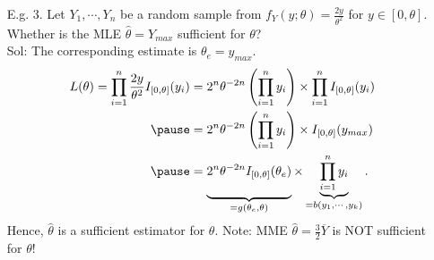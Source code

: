 \begin{frame}
 \begin{enumerate}
  \item[E.g. 3.] Let $Y_1,\cdots,Y_n$ be a random sample from $f_Y(y;\theta)=\frac{2y}{\theta^2}$ for $y\in [0,\theta]$. Whether is the MLE $\widehat\theta = Y_{max}$ sufficient for $\theta$? \\[1em] \pause
  \vfill
  Sol: The corresponding estimate is $\theta_e= y_{max}$. \pause
  \begin{align*}
   L(\theta) = \prod_{i=1}^n \frac{2y}{\theta^2} I_{[0,\theta]}(y_i) &
   = 2^n\theta^{-2n} \left(\prod_{i=1}^n y_i\right) \times \prod_{i=1}^n I_{[0,\theta]}(y_i)\\ \pause
   &= 2^n\theta^{-2n} \left(\prod_{i=1}^n y_i\right) \times I_{[0,\theta]}(y_{max})\\  \pause
   &= \underbrace{\mystrut{1.5em} 2^n\theta^{-2n}I_{[0,\theta]}(\theta_e)}_{=g(\theta_e,\theta)}  \times \underbrace{\prod_{i=1}^n y_i}_{=b(y_1,\cdots,y_k)}.
  \end{align*} \pause
  Hence, $\widehat\theta$ is a sufficient estimator for $\theta$.\myEnd
  \vfill  \pause
  Note: MME $\widehat\theta = \frac{3}{2}\overline{Y}$ is NOT sufficient for $\theta$!
  \end{enumerate}
\end{frame}

